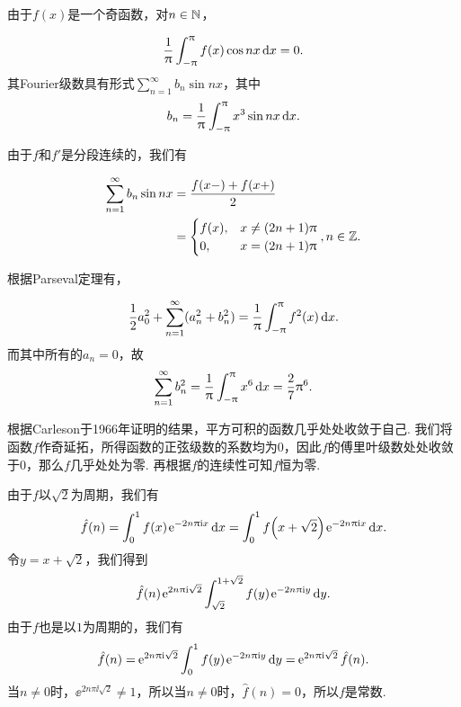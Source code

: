 \begin{ans}
  \begin{enumb}
    \item 由于$f(x)$是一个奇函数，对$n\in\mathbb N$，
  \end{enumb}
  \[ \frac1{\uppi}\int_{-\uppi}^\uppi f(x)\cos nx\,\mathrm dx = 0. \]
  其Fourier级数具有形式$\sum_{n=1}^\infty b_n\sin nx$，其中
  \[
    b_n=\frac1{\uppi}\int_{-\uppi}^\uppi x^3\sin nx\,\mathrm dx.
  \]
  \begin{enumc}
    \setcounter{enumi}{1}
    \item 由于$f$和$f'$是分段连续的，我们有
  \end{enumc}
      \begin{align*}
        \sum_{n=1}^\infty b_n\sin nx
        & = \frac{f(x-)+f(x+)}2 \\
        & = \begin{cases}
          f(x), & x\ne (2n+1)\uppi\\
          0, & x= (2n+1)\uppi
        \end{cases},n\in\mathbb Z.
      \end{align*}
  \begin{enumc}
    \setcounter{enumi}{2}
    \item 根据Parseval定理有，
  \end{enumc}
  \[
    \frac12a_0^2 + \sum_{n=1}^\infty (a_n^2+b_n^2)
    = \frac1{\uppi}\int_{-\uppi}^\uppi f^2(x)\,\mathrm dx.
  \]
  而其中所有的$a_n=0$，故
  \[
    \sum_{n=1}^\infty b_n^2= \frac1{\uppi}\int_{-\uppi}^\uppi
    x^6\,\mathrm dx = \frac27\uppi^6.
  \]
\end{ans}

\begin{ans}
  根据Carleson于1966年证明的结果，平方可积的函数几乎处处收敛于自己. 我们将函数$f$作奇延拓，所得函数的正弦级数的系数均为0，因此$f$的傅里叶级数处处收敛于0，那么$f$几乎处处为零. 再根据$f$的连续性可知$f$恒为零.
\end{ans}

\begin{ans}
  由于$f$以$\sqrt2$为周期，我们有
  \[
    \hat f(n) = \int_0^1 f(x)\operatorname{\!\!\;\mathrm e}^{-2n\uppi\mathrm i x}\mathrm dx
      = \int_0^1f\Big( x+\sqrt2 \Big)\operatorname{\!\!\;\mathrm e}^{-2n\uppi\mathrm i x}\mathrm dx.
  \]
  令$y=x+\sqrt2$，我们得到
  \[
    \hat f(n) \operatorname{\!\!\;\mathrm e}^{2n\uppi\mathrm i \sqrt2}\int_{\sqrt2}
    ^{1+\sqrt2}f(y)\operatorname{\!\!\;\mathrm e}^{-2n\uppi\mathrm i y}\mathrm dy.
  \]
  由于$f$也是以$1$为周期的，我们有
  \[
    \hat f(n) = \operatorname{\!\!\;\mathrm e}^{2n\uppi\mathrm i\sqrt2}\int_0^1f(y)
    \operatorname{\!\!\;\mathrm e}^{-2n\uppi\mathrm i y}\mathrm dy = \operatorname{\!\!\;\mathrm e}^{2n\uppi\mathrm i\sqrt2}
    \hat f(n).
  \]
  当$n\ne0$时，$\ee^{2n\pi\ii\sqrt2}\ne1$，所以当$n\ne0$时，$\hat f(n)=0$，所以$f$是常数.
\end{ans}

